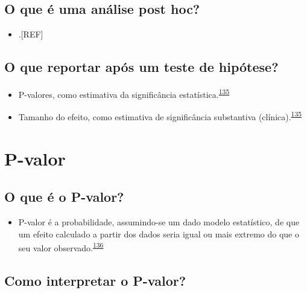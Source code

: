 \documentclass[
]{book}
\providecommand{\tightlist}{%
  \setlength{\itemsep}{0pt}\setlength{\parskip}{0pt}}
\begin{document}
\hypertarget{o-que-uxe9-uma-anuxe1lise-post-hoc}{%
\subsection{O que é uma análise post hoc?}\label{o-que-uxe9-uma-anuxe1lise-post-hoc}}

\begin{itemize}
\tightlist
\item
  .{[}REF{]}
\end{itemize}

\hypertarget{o-que-reportar-apuxf3s-um-teste-de-hipuxf3tese}{%
\subsection{O que reportar após um teste de hipótese?}\label{o-que-reportar-apuxf3s-um-teste-de-hipuxf3tese}}

\begin{itemize}
\item
  P-valores, como estimativa da significância estatística.\textsuperscript{\protect\hyperlink{ref-Sullivan2012}{135}}
\item
  Tamanho do efeito, como estimativa de significância substantiva (clínica).\textsuperscript{\protect\hyperlink{ref-Sullivan2012}{135}}
\end{itemize}

\hypertarget{p-valor}{%
\section{P-valor}\label{p-valor}}

\hypertarget{o-que-uxe9-o-p-valor}{%
\subsection{O que é o P-valor?}\label{o-que-uxe9-o-p-valor}}

\begin{itemize}
\tightlist
\item
  P-valor é a probabilidade, assumindo-se um dado modelo estatístico, de que um efeito calculado a partir dos dados seria igual ou mais extremo do que o seu valor observado.\textsuperscript{\protect\hyperlink{ref-wasserstein2016}{136}}
\end{itemize}

\hypertarget{como-interpretar-o-p-valor}{%
\subsection{Como interpretar o P-valor?}\label{como-interpretar-o-p-valor}}
\end{document}
